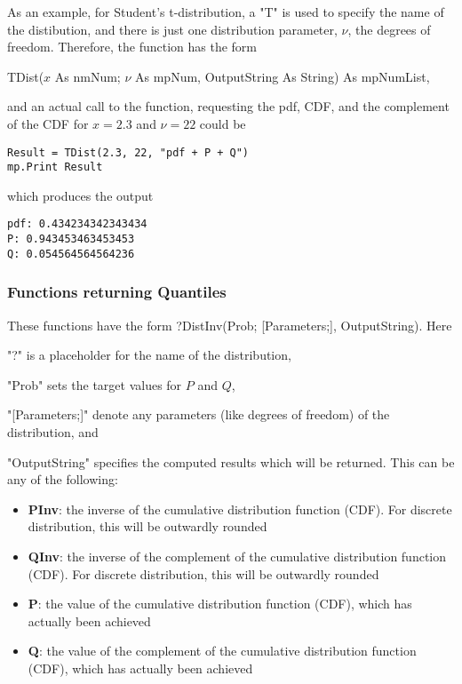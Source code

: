 \vspace{0.3cm}
As an example, for Student's t-distribution, a "T" is used to specify the name of the distibution, and there is just one distribution parameter, $\nu$, the degrees of freedom. Therefore,  the function has the form

\vspace{0.3cm}
\textsf{TDist($x$ As nmNum; $\nu$ As mpNum, OutputString As String) As mpNumList}, 

\vspace{0.3cm}
and an actual call to the function, requesting the pdf, CDF, and the complement of the CDF for $x=2.3$ and $\nu=22$ could be

\begin{lstlisting}
Result = TDist(2.3, 22, "pdf + P + Q")
mp.Print Result
\end{lstlisting}
which produces the output

\begin{verbatim}
pdf: 0.434234342343434
P: 0.943453463453453
Q: 0.054564564564236
\end{verbatim}




\newpage
\subsubsection{Functions returning Quantiles}
\label{Functions returning Quantiles}
These functions have the form \textsf{?DistInv(Prob; [Parameters;], OutputString)}.
Here 

"?" is a placeholder for the name of the distribution, 

"Prob" sets the target values for $P$ and $Q$, 

"[Parameters;]" denote any parameters (like degrees of freedom) of the distribution, and 

"OutputString" specifies the computed results which will be returned. This can be any of the following:

\begin{itemize}
	\item \textbf{PInv}: the inverse of the cumulative distribution function (CDF). For discrete distribution, this will be outwardly rounded
	\item \textbf{QInv}: the inverse of the complement of the cumulative distribution function (CDF). For discrete distribution, this will be outwardly rounded
	\item \textbf{P}: the value of the cumulative distribution function (CDF), which has actually been achieved
	\item \textbf{Q}: the value of the complement of the cumulative distribution function (CDF), which has actually been achieved
\end{itemize}


